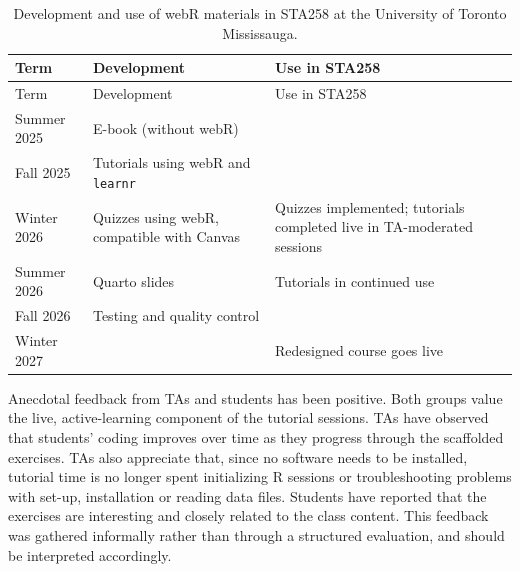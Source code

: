 \documentclass[
  12pt]{article}
\begin{document}
\begin{longtable}[]{@{}
  >{\raggedright\arraybackslash}p{}
  >{\raggedright\arraybackslash}p{}
  >{\raggedright\arraybackslash}p{}@{}}
\caption{Development and use of webR materials in STA258 at the
University of Toronto Mississauga.}\label{tbl-sta258}\tabularnewline
\toprule\noalign{}
\begin{minipage}[b]{\linewidth}\raggedright
Term
\end{minipage} & \begin{minipage}[b]{\linewidth}\raggedright
Development
\end{minipage} & \begin{minipage}[b]{\linewidth}\raggedright
Use in STA258
\end{minipage} \\
\midrule\noalign{}
\endfirsthead
\toprule\noalign{}
\begin{minipage}[b]{\linewidth}\raggedright
Term
\end{minipage} & \begin{minipage}[b]{\linewidth}\raggedright
Development
\end{minipage} & \begin{minipage}[b]{\linewidth}\raggedright
Use in STA258
\end{minipage} \\
\midrule\noalign{}
\endhead
\bottomrule\noalign{}
\endlastfoot
Summer 2025 & E-book (without webR) & \\
Fall 2025 & Tutorials using webR and \texttt{learnr} & \\
Winter 2026 & Quizzes using webR, compatible with Canvas & Quizzes
implemented; tutorials completed live in TA-moderated sessions \\
Summer 2026 & Quarto slides & Tutorials in continued use \\
Fall 2026 & Testing and quality control & \\
Winter 2027 & & Redesigned course goes live \\
\end{longtable}

Anecdotal feedback from TAs and students has been positive. Both groups
value the live, active-learning component of the tutorial sessions. TAs
have observed that students' coding improves over time as they progress
through the scaffolded exercises. TAs also appreciate that, since no
software needs to be installed, tutorial time is no longer spent
initializing R sessions or troubleshooting problems with set-up,
installation or reading data files. Students have reported that the
exercises are interesting and closely related to the class content. This
feedback was gathered informally rather than through a structured
evaluation, and should be interpreted accordingly.
\end{document}
